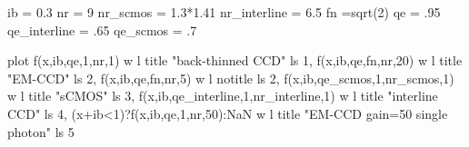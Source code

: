 ib = 0.3
nr = 9
nr_scmos = 1.3*1.41
nr_interline = 6.5
fn =sqrt(2)
qe = .95
qe_interline = .65
qe_scmos = .7

plot f(x,ib,qe,1,nr,1) w l title "back-thinned CCD" ls 1, f(x,ib,qe,fn,nr,20) w l title "EM-CCD" ls 2, f(x,ib,qe,fn,nr,5) w l notitle ls 2, f(x,ib,qe_scmos,1,nr_scmos,1) w l title "sCMOS" ls 3, f(x,ib,qe_interline,1,nr_interline,1) w l title "interline CCD" ls 4, (x+ib<1)?f(x,ib,qe,1,nr,50):NaN w l title "EM-CCD gain=50 single photon" ls 5





